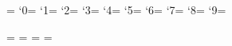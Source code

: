\usepackage{fontspec}

\setmainfont{Georgia}

\chardef{}
\makeatletter
\ifx\e@alloc@intercharclass@top\@undefined
    \chardef{}
\else
    \chardef\CharBound=\e@alloc@intercharclass@top
\fi
\makeatother
\newXeTeXintercharclass\CharNumbers
\XeTeXcharclass`0=\CharNumbers
\XeTeXcharclass`1=\CharNumbers
\XeTeXcharclass`2=\CharNumbers
\XeTeXcharclass`3=\CharNumbers
\XeTeXcharclass`4=\CharNumbers
\XeTeXcharclass`5=\CharNumbers
\XeTeXcharclass`6=\CharNumbers
\XeTeXcharclass`7=\CharNumbers
\XeTeXcharclass`8=\CharNumbers
\XeTeXcharclass`9=\CharNumbers

\XeTeXinterchartoks\CharNormal\CharNumbers={\begingroup\digits}
\XeTeXinterchartoks\CharBound\CharNumbers={\begingroup\digits}
\XeTeXinterchartoks\CharNumbers\CharNormal={\endgroup}
\XeTeXinterchartoks\CharNumbers\CharBound={\endgroup}
